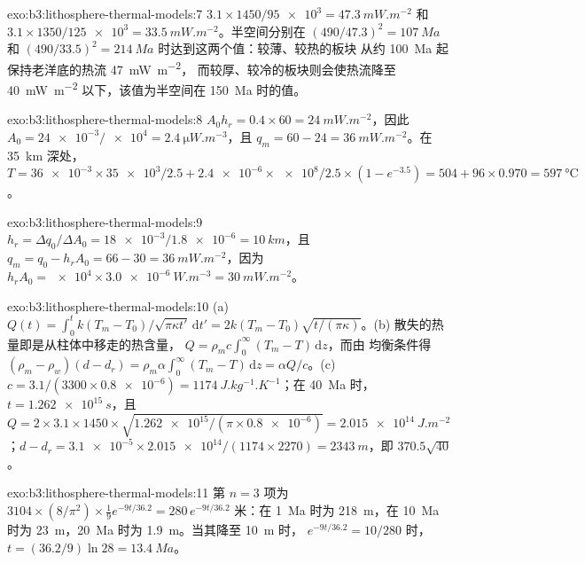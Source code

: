 \begin{solution}{exo:b3:lithosphere-thermal-models:7}
$3.1\times1450/\num{95e3} = \qty{47.3}{mW.m^{-2}}$ 和 $3.1\times1350/\num{125e3}
= \qty{33.5}{mW.m^{-2}}$。半空间分别在 $(490/47.3)^2 =
\qty{107}{Ma}$ 和 $(490/33.5)^2 = \qty{214}{Ma}$ 时达到这两个值：较薄、较热的板块
从约 \qty{100}{Ma} 起保持老洋底的热流 \qty{47}{mW.m^{-2}}，
而较厚、较冷的板块则会使热流降至
\qty{40}{mW.m^{-2}} 以下，该值为半空间在 \qty{150}{Ma} 时的值。
\end{solution}

\begin{solution}{exo:b3:lithosphere-thermal-models:8}
$A_0h_r = 0.4\times60 = \qty{24}{mW.m^{-2}}$，因此 $A_0 =
\num{24e-3}/\num{e4} = \qty{2.4}{\micro W.m^{-3}}$，且 $q_m = 60 - 24 =
\qty{36}{mW.m^{-2}}$。在 \qty{35}{km} 深处，$T = \num{36e-3}\times\num{35e3}/2.5 +
\num{2.4e-6}\times\num{e8}/2.5\times(1 - e^{-3.5}) = 504 + 96\times0.970 =
\qty{597}{\celsius}$。
\end{solution}

\begin{solution}{exo:b3:lithosphere-thermal-models:9}
$h_r = \Delta q_0/\Delta A_0 = \num{18e-3}/\num{1.8e-6} = \qty{10}{km}$，且
$q_m = q_0 - h_rA_0 = 66 - 30 = \qty{36}{mW.m^{-2}}$，因为 $h_rA_0 =
\num{e4}\times\qty{3.0e-6}{W.m^{-3}} = \qty{30}{mW.m^{-2}}$。
\end{solution}

\begin{solution}{exo:b3:lithosphere-thermal-models:10}
(a) $Q(t) = \int_0^tk(T_m - T_0)/\sqrt{\pi\kappa t'}\,\mathrm dt' =
2k(T_m - T_0)\sqrt{t/(\pi\kappa)}$。(b) 散失的热量即是从柱体中移走的热含量，
$Q = \rho_mc\int_0^\infty(T_m - T)\,\mathrm dz$，而由
均衡条件得 $(\rho_m - \rho_w)(d - d_r) = \rho_m\alpha\int_0^\infty(T_m -
T)\,\mathrm dz = \alpha Q/c$。(c) $c = 3.1/(3300\times\num{0.8e-6}) =
\qty{1174}{J.kg^{-1}.K^{-1}}$；在 \qty{40}{Ma} 时，$t = \qty{1.262e15}{s}$，且
$Q = 2\times3.1\times1450\times\sqrt{\num{1.262e15}/(\pi\times\num{0.8e-6})} =
\qty{2.015e14}{J.m^{-2}}$；$d - d_r = \num{3.1e-5}\times\num{2.015e14}/
(1174\times2270) = \qty{2343}{m}$，即 $370.5\sqrt{40}$。
\end{solution}

\begin{solution}{exo:b3:lithosphere-thermal-models:11}
第 $n = 3$ 项为 $3104\times(8/\pi^2)\times\tfrac19e^{-9t/36.2} =
280\,e^{-9t/36.2}$ 米：在 \qty{1}{Ma} 时为 \qty{218}{m}，在
\qty{10}{Ma} 时为 \qty{23}{m}，\qty{20}{Ma} 时为 \qty{1.9}{m}。当其降至 \qty{10}{m} 时，
$e^{-9t/36.2} = 10/280$ 时，$t = (36.2/9)\ln28 = \qty{13.4}{Ma}$。
\end{solution}


